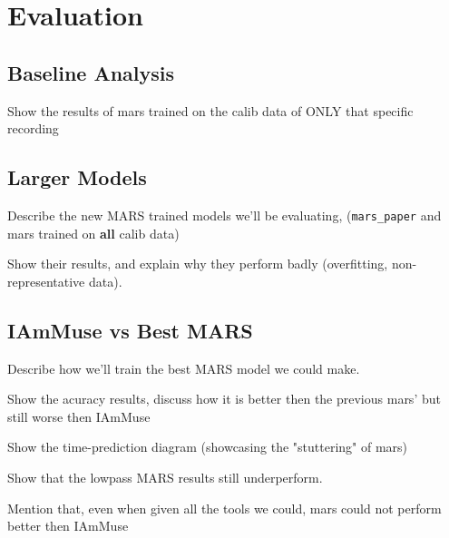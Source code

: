 \chapter{Evaluation}
\label{chapter: evaluation}

\section{Baseline Analysis}
\label{section: evaluation - baseline analysis}

Show the results of mars trained on the calib data of ONLY that specific recording

\section{Larger Models}
\label{section: evaluation - larger models}

Describe the new MARS trained models we'll be evaluating, (\texttt{mars\_paper} and mars trained on \textbf{all} calib data)

Show their results, and explain why they perform badly (overfitting, non-representative data).


\section{IAmMuse vs Best MARS}
\label{section: evaluation - iammuse vs best mars}

Describe how we'll train the best MARS model we could make.

Show the acuracy results, discuss how it is better then the previous mars' but still worse then IAmMuse

Show the time-prediction diagram (showcasing the "stuttering" of mars)

Show that the lowpass MARS results still underperform.

Mention that, even when given all the tools we could, mars could not perform better then IAmMuse